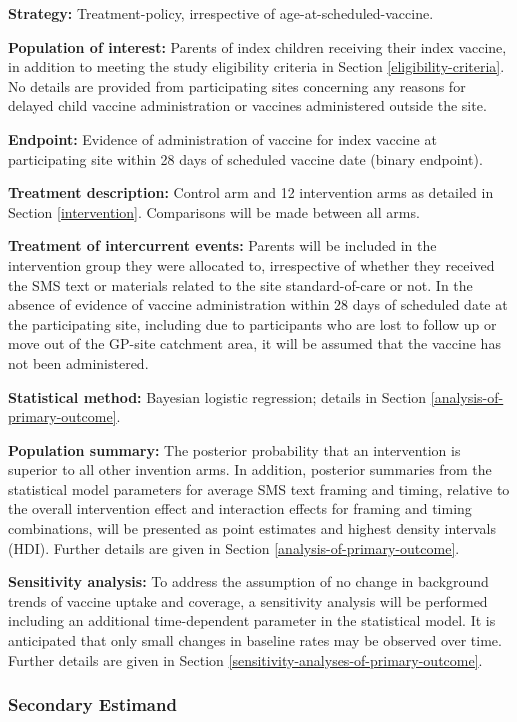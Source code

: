 \documentclass[
  bibliography=totoc]{scrreprt}
\begin{document}
\textbf{Strategy:} Treatment-policy, irrespective of age-at-scheduled-vaccine.

\textbf{Population of interest:} Parents of index children receiving their index vaccine, in addition to meeting the study eligibility criteria in Section \ref{eligibility-criteria}.
No details are provided from participating sites concerning any reasons for delayed child vaccine administration or vaccines administered outside the site.

\textbf{Endpoint:} Evidence of administration of vaccine for index vaccine at participating site within 28 days of scheduled vaccine date (binary endpoint).

\textbf{Treatment description:} Control arm and 12 intervention arms as detailed in Section \ref{intervention}.
Comparisons will be made between all arms.

\textbf{Treatment of intercurrent events:} Parents will be included in the intervention group they were allocated to, irrespective of whether they received the SMS text or materials related to the site standard-of-care or not.
In the absence of evidence of vaccine administration within 28 days of scheduled date at the participating site, including due to participants who are lost to follow up or move out of the GP-site catchment area, it will be assumed that the vaccine has not been administered.

\textbf{Statistical method:} Bayesian logistic regression; details in Section \ref{analysis-of-primary-outcome}.

\textbf{Population summary:} The posterior probability that an intervention is superior to all other invention arms.
In addition, posterior summaries from the statistical model parameters for average SMS text framing and timing, relative to the overall intervention effect and interaction effects for framing and timing combinations, will be presented as point estimates and highest density intervals (HDI).
Further details are given in Section \ref{analysis-of-primary-outcome}.

\textbf{Sensitivity analysis:} To address the assumption of no change in background trends of vaccine uptake and coverage, a sensitivity analysis will be performed including an additional time-dependent parameter in the statistical model.
It is anticipated that only small changes in baseline rates may be observed over time.
Further details are given in Section \ref{sensitivity-analyses-of-primary-outcome}.

\hypertarget{secondary-estimand}{%
\subsubsection{Secondary Estimand}\label{secondary-estimand}}
\end{document}
